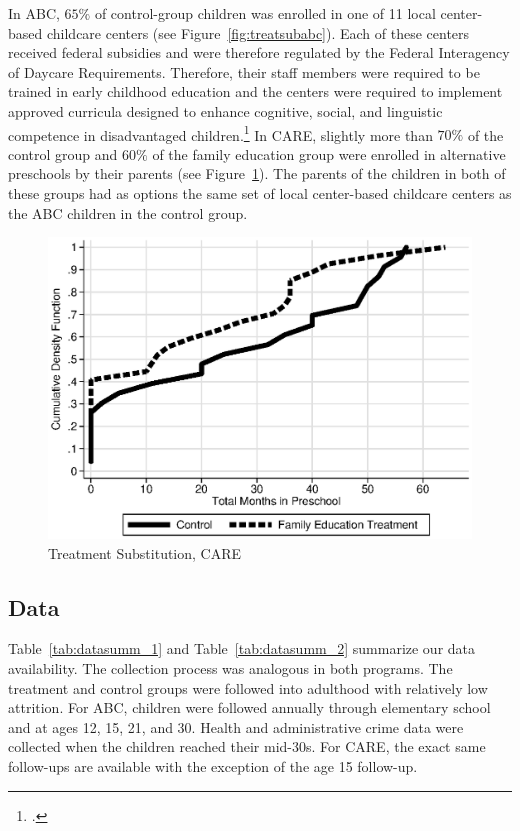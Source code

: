 \noindent In ABC, $65\%$ of control-group children was enrolled in one of 11 local center-based childcare centers (see Figure~\ref{fig:treatsubabc}). Each of these centers received federal subsidies and were therefore regulated by the Federal Interagency of Daycare Requirements. Therefore, their staff members were required to be trained in early childhood education and the centers were required to implement approved curricula designed to enhance cognitive, social, and linguistic competence in disadvantaged children.\footnote{\citet{Burchinal_etal_1989_CD_Daycare-Pre-K-Dev}.} In CARE, slightly more than $70\%$ of the control group and $60\%$ of the family education group were enrolled in alternative preschools by their parents (see Figure~\ref{fig:treatsubcare}). The parents of the children in both of these groups had as options the same set of local center-based childcare centers as the ABC children in the control group.

\begin{figure}[H]
		\caption{Treatment Substitution, CARE} \label{fig:treatsubcare}
		\includegraphics[width=.9\columnwidth]{output/care_controlcontamination_months.eps}
\end{figure}
 

\subsection{Data} \label{section:data}

\noindent Table~\ref{tab:datasumm_1} and Table~\ref{tab:datasumm_2} summarize our data availability. The collection process was analogous in both programs. The treatment and control groups were followed into adulthood with relatively low attrition. For ABC, children were followed annually through elementary school and at ages 12, 15, 21, and 30. Health and administrative crime data were collected when the children reached their mid-30s. For CARE, the exact same follow-ups are available with the exception of the age 15 follow-up.\\

